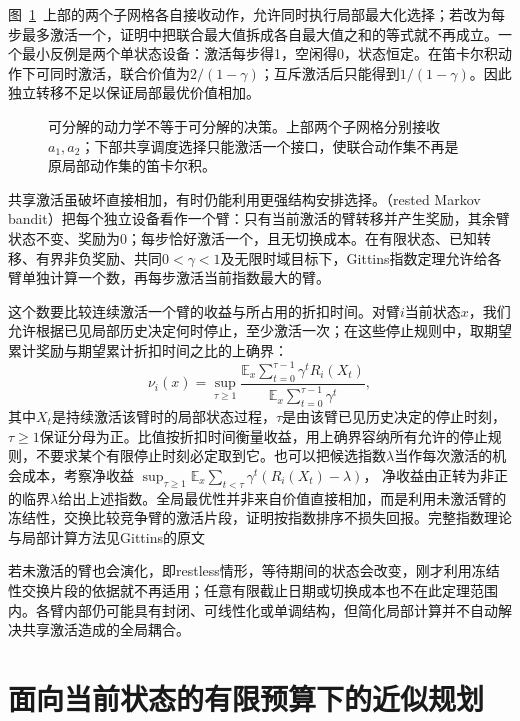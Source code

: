 图~\ref{fig:rl-planning-factorization}~上部的两个子网格各自接收动作，允许同时执行局部最大化选择；若改为每步最多激活一个，证明中把联合最大值拆成各自最大值之和的等式就不再成立。一个最小反例是两个单状态设备：激活每步得1，空闲得0，状态恒定。在笛卡尔积动作下可同时激活，联合价值为$2/(1-\gamma)$；互斥激活后只能得到$1/(1-\gamma)$。因此独立转移不足以保证局部最优价值相加。

\begin{figure}[htbp]
 \centering
 
 \caption{可分解的动力学不等于可分解的决策。上部两个子网格分别接收$a_1,a_2$；下部共享调度选择只能激活一个接口，使联合动作集不再是原局部动作集的笛卡尔积。}
 \label{fig:rl-planning-factorization}
\end{figure}

共享激活虽破坏直接相加，有时仍能利用更强结构安排选择。（rested Markov bandit）把每个独立设备看作一个臂：只有当前激活的臂转移并产生奖励，其余臂状态不变、奖励为0；每步恰好激活一个，且无切换成本。在有限状态、已知转移、有界非负奖励、共同$0<\gamma<1$及无限时域目标下，Gittins指数定理允许给各臂单独计算一个数，再每步激活当前指数最大的臂。

这个数要比较连续激活一个臂的收益与所占用的折扣时间。对臂$i$当前状态$x$，我们允许根据已见局部历史决定何时停止，至少激活一次；在这些停止规则中，取期望累计奖励与期望累计折扣时间之比的上确界：
\begin{equation}
 \nu_i(x)=\sup_{\tau\geq1}
 \frac{\mathbb E_x\sum_{t=0}^{\tau-1}\gamma^t R_i(X_t)}
      {\mathbb E_x\sum_{t=0}^{\tau-1}\gamma^t},
 \label{eq:rl-planning-gittins}
\end{equation}
其中$X_t$是持续激活该臂时的局部状态过程，$\tau$是由该臂已见历史决定的停止时刻，$\tau\geq1$保证分母为正。比值按折扣时间衡量收益，用上确界容纳所有允许的停止规则，不要求某个有限停止时刻必定取到它。也可以把候选指数$\lambda$当作每次激活的机会成本，考察净收益
$\sup_{\tau\geq1}\mathbb E_x\sum_{t<\tau}\gamma^t(R_i(X_t)-\lambda)$，
净收益由正转为非正的临界$\lambda$给出上述指数。全局最优性并非来自价值直接相加，而是利用未激活臂的冻结性，交换比较竞争臂的激活片段，证明按指数排序不损失回报。完整指数理论与局部计算方法见Gittins的原文

若未激活的臂也会演化，即restless情形，等待期间的状态会改变，刚才利用冻结性交换片段的依据就不再适用；任意有限截止日期或切换成本也不在此定理范围内。各臂内部仍可能具有封闭、可线性化或单调结构，但简化局部计算并不自动解决共享激活造成的全局耦合。

\section{面向当前状态的有限预算下的近似规划}
\label{sec:rl-planning-local-search}

